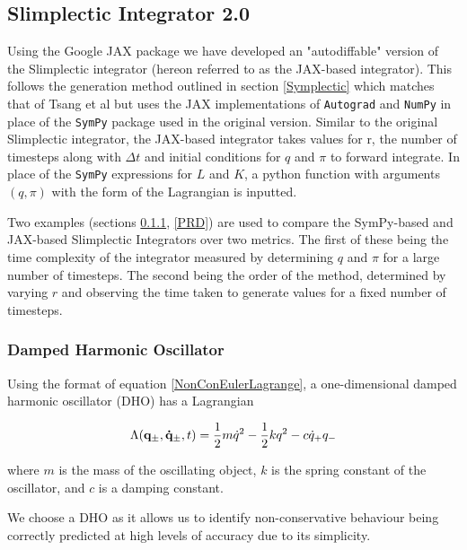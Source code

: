\documentclass[10pt]{iopart}
\begin{document}
\subsection{Slimplectic Integrator 2.0}
\label{SI2.0}
Using the Google JAX package we have developed an "autodiffable" version of the Slimplectic integrator (hereon referred to as the JAX-based integrator). This follows the generation method outlined in section \ref{Symplectic} which matches that of Tsang et al \cite{Tsang_Slimplectic} but uses the JAX implementations of \texttt{Autograd} and \texttt{NumPy} in place of the \texttt{SymPy} package used in the original version. Similar to the original Slimplectic integrator, the JAX-based integrator takes values for r, the number of timesteps along with $\Delta t$ and initial conditions for $q$ and $\pi$ to forward integrate. In place of the \texttt{SymPy} expressions for $L$ and $K$, a python function with arguments $(q,\pi)$ with the form of the Lagrangian is inputted. 

Two examples (sections \ref{DHO}, \ref{PRD}) are used to compare the SymPy-based and JAX-based Slimplectic Integrators over two metrics. The first of these being the time complexity of the integrator measured by determining $q$ and $\pi$ for a large number of timesteps. The second being the order of the method, determined by varying $r$ and observing the time taken to generate values for a fixed number of timesteps.


\subsubsection{Damped Harmonic Oscillator \\}
\label{DHO}
Using the format of equation \ref{NonConEulerLagrange}, a one-dimensional damped harmonic oscillator (DHO) has a Lagrangian

\begin{equation}
\label{DHOeqn}
	\Lambda(\bold{q_{\pm},\dot{q}_{\pm}},t) = \frac{1}{2}m\dot{q}^2 - \frac{1}{2}kq^2 - c\dot{q}_+q_-
\end{equation}

where $m$ is the mass of the oscillating object, $k$ is the spring constant of the oscillator, and $c$ is a damping constant.  

We choose a DHO as it allows us to identify non-conservative behaviour being correctly predicted at high levels of accuracy due to its simplicity. 
\end{document}
